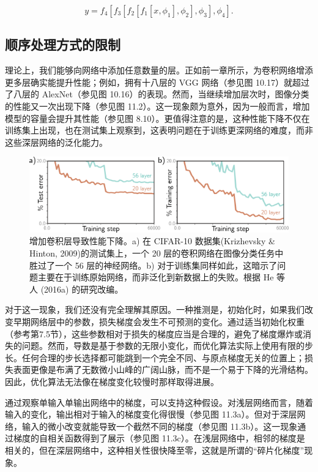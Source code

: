 \begin{equation}
y = f_4 \left[ f_3 \left[ f_2 \left[ f_1[x, \phi_1], \phi_2 \right], \phi_3 \right], \phi_4 \right]. 
\end{equation}
\subsection{顺序处理方式的限制}
理论上，我们能够向网络中添加任意数量的层。正如前一章所示，为卷积网络增添更多层确实能提升性能；例如，拥有十八层的 VGG 网络（参见图 10.17）就超过了八层的 AlexNet（参见图 10.16）的表现。然而，当继续增加层次时，图像分类的性能又一次出现下降（参见图 11.2）。这一现象颇为意外，因为一般而言，增加模型的容量会提升其性能（参见图 8.10）。更值得注意的是，这种性能下降不仅在训练集上出现，也在测试集上观察到，这表明问题在于训练更深网络的难度，而非这些深层网络的泛化能力。

\begin{figure}[ht!]
\centering
\includegraphics[width=0.7\linewidth]{png/chapter11/ResidualMotivation.png}
\caption{增加卷积层导致性能下降。a) 在 CIFAR-10 数据集(Krizhevsky \& Hinton, 2009)的测试集上，一个 20 层的卷积网络在图像分类任务中胜过了一个 56 层的神经网络。b) 对于训练集同样如此，这暗示了问题主要在于训练原始网络，而非泛化到新数据上的失败。根据 He 等人 (2016a) 的研究改编。}
\end{figure}


对于这一现象，我们还没有完全理解其原因。一种推测是，初始化时，如果我们改变早期网络层中的参数，损失梯度会发生不可预测的变化。通过适当初始化权重（参考第7.5节），这些参数相对于损失的梯度应当是合理的，避免了梯度爆炸或消失的问题。然而，导数是基于参数的无限小变化，而优化算法实际上使用有限的步长。任何合理的步长选择都可能跳到一个完全不同、与原点梯度无关的位置上；损失表面更像是布满了无数微小山峰的广阔山脉，而不是一个易于下降的光滑结构。因此，优化算法无法像在梯度变化较慢时那样取得进展。

通过观察单输入单输出网络中的梯度，可以支持这种假设。对浅层网络而言，随着输入的变化，输出相对于输入的梯度变化得很慢（参见图 11.3a）。但对于深层网络，输入的微小改变就能导致一个截然不同的梯度（参见图 11.3b）。这一现象通过梯度的自相关函数得到了展示（参见图 11.3c）。在浅层网络中，相邻的梯度是相关的，但在深层网络中，这种相关性很快降至零，这就是所谓的“碎片化梯度”现象。

